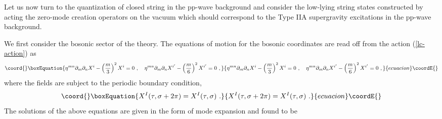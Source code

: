\documentclass[a4paper,12pt]{article}
\numberwithin{equation}{section}
\begin{document}
Let us now turn to the quantization of closed string in the pp-wave
background \cite{hyu158} and consider the low-lying string states
constructed by acting the zero-mode creation operators on the vacuum
which should correspond to the Type IIA supergravity excitations in
the pp-wave background.

We first consider the bosonic sector of the theory.  The equations of
motion for the bosonic coordinates \coordHE{} are read off from the action
(\ref{lc-action}) as
\begin{equation}\coord{}\boxEquation{
\eta^{mn} \partial_m \partial_n X^i
  - \left( \frac{m}{3} \right)^2 X^i = 0 ~,~~~
\eta^{mn} \partial_m \partial_n X^{i'}
  - \left( \frac{m}{6} \right)^2 X^{i'} = 0~,
\label{beom}
}{
\eta^{mn} \partial_m \partial_n X^i
  - \left( \frac{m}{3} \right)^2 X^i = 0 ~,~~~
\eta^{mn} \partial_m \partial_n X^{i'}
  - \left( \frac{m}{6} \right)^2 X^{i'} = 0~,
}{ecuacion}\coordE{}\end{equation}
where the fields are subject to the periodic boundary condition,
\begin{equation}\coord{}\boxEquation{
X^I (\tau, \sigma+2 \pi) = X^I (\tau, \sigma)~.
}{
X^I (\tau, \sigma+2 \pi) = X^I (\tau, \sigma)~.
}{ecuacion}\coordE{}\end{equation}
The solutions of the above equations are given in the form of mode
expansion and found to be
\end{document}
